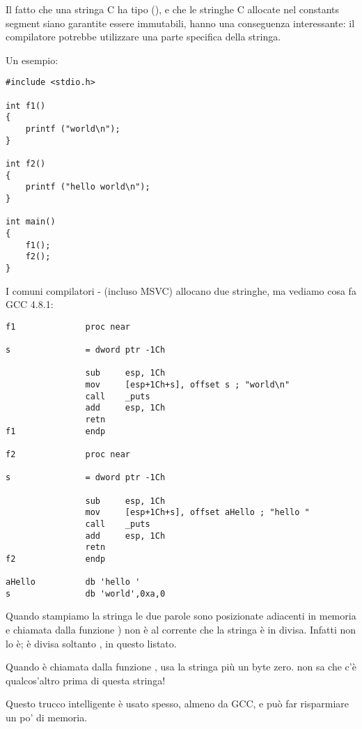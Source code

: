 \label{use_parts_of_C_strings}

Il fatto che una stringa C  ha  tipo (), 
e che le stringhe C allocate nel constants segment siano garantite essere immutabili, hanno una conseguenza interessante:
il compilatore potrebbe utilizzare una parte specifica della stringa.

Un esempio:

\begin{lstlisting}
#include <stdio.h>

int f1()
{
	printf ("world\n");
}

int f2()
{
	printf ("hello world\n");
}

int main()
{
	f1();
	f2();
}
\end{lstlisting}

I comuni compilatori \CCpp{}- (incluso MSVC) allocano due stringhe, ma vediamo cosa fa GCC 4.8.1:

\begin{lstlisting}[caption=GCC 4.8.1 + IDA]
f1              proc near

s               = dword ptr -1Ch

                sub     esp, 1Ch
                mov     [esp+1Ch+s], offset s ; "world\n"
                call    _puts
                add     esp, 1Ch
                retn
f1              endp

f2              proc near

s               = dword ptr -1Ch

                sub     esp, 1Ch
                mov     [esp+1Ch+s], offset aHello ; "hello "
                call    _puts
                add     esp, 1Ch
                retn
f2              endp

aHello          db 'hello '
s               db 'world',0xa,0
\end{lstlisting}

Quando stampiamo la stringa  le due parole sono posizionate adiacenti in memoria e \puts chiamata dalla funzione ) non è al corrente che la stringa è in divisa. Infatti non lo è; è divisa soltanto , in questo listato.

Quando \puts è chiamata dalla funzione , usa la stringa  più un byte zero. \puts non sa che c'è qualcos'altro prima di questa stringa!

Questo trucco intelligente è usato spesso, almeno da GCC, e può far risparmiare un po' di memoria.

